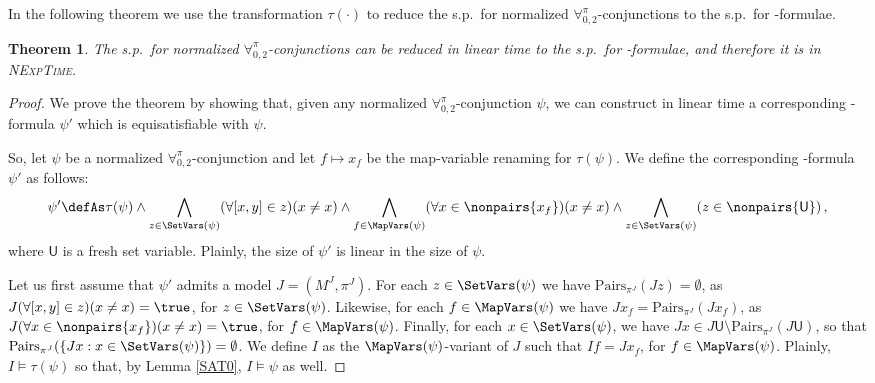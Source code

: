 \documentclass[submission,copyright,creativecommons]{eptcs}
\newtheorem{theorem}{Theorem}
\newcommand{\Lang}{\ensuremath{\mathbf{\forall}^{\pi}_{0,2}}\xspace}
\newcommand{\assignment}[1]{M^{#1}}
\newcommand{\pairf}[1]{\pi^{#1}}
\newcommand{\inter}{I}
\newcommand{\interp}{J}
\newcommand{\ipairfp}{\pairf{\interp}}
\newcommand{\iassignmentp}{\assignment{\interp}}
\newcommand{\pairs}[2]{\mathrm{Pairs}_{\pi^{#1}}(#2)}
\newcommand{\D}{\corr{\mathsf{U}}}
\newcommand{\svx}{x}
\newcommand{\svy}{y}
\newcommand{\svz}{z}
\newcommand{\mvx}{f}
\newcommand{\corr}[1]{#1}
\begin{document}
In the following theorem we use the transformation $\tau(\cdot)$ to
reduce the s.p.\ for normalized \Lang-conjunctions to the s.p.\ for
\Forallpizero-formulae.

\begin{theorem}\label{DEC}
The s.p.\ for normalized \Lang-conjunctions can be reduced in linear
time to the s.p.\ for \Forallpizero-formulae, and therefore it is in
\textsc{NExpTime}.
\end{theorem}
\begin{proof}
We prove the theorem by showing that, given any normalized
\Lang-conjunction $\psi$, we can construct in linear time a
corresponding \Forallpizero-formula $\psi'$ which is
equisatisfiable with $\psi$.

So, let $\psi$ be a normalized \Lang-conjunction and let $\mvx
\mapsto \svx_\mvx$ be the map-variable renaming for $\tau(\psi)$.
We define the corresponding \Forallpizero-formula $\psi'$ as
follows:
\[
\psi' \defAs \tau(\psi) 
\wedge \bigwedge_{\svz \in \SetVars(\psi)}(\forall [\svx,\svy] \in
\svz)(\svx \neq \svx) 
\wedge \bigwedge_{\mvx \in \MapVars(\psi)} (\forall \svx \in
\nonpairs{\svx_\mvx})(\svx \neq \svx) 
\wedge \bigwedge_{\svz \in \SetVars(\psi)} (\svz \in \nonpairs{\D})
\,,
\]
where $\D$ is a fresh set variable. Plainly, the size of $\psi'$ 
is linear in the size of $\psi$.

Let us first assume that $\psi'$ admits a model $\interp =
(\iassignmentp, \ipairfp)$.  For each $\svz \in \SetVars(\psi)$ we
have $\pairs{\interp}{\interp \svz}=\emptyset$, as $\interp (\forall
[\svx,\svy] \in \svz)(\svx \neq \svx) = \true$, for $\svz \in
\SetVars(\psi)$.  Likewise, for each $\mvx \in \MapVars(\psi)$
we have $\interp \svx_\mvx = \pairs{\interp}{\interp \svx_\mvx}$, as
$\interp (\forall \svx \in \nonpairs{\svx_\mvx})(\svx \neq \svx) =
\true$, for $\mvx \in \MapVars(\psi)$.  Finally, for each $\svx \in
\SetVars(\psi)$, we have $\interp \svx \in \interp \D \setminus
\pairs{\interp}{\interp \D}$, so that $\pairs{\interp}{\{ \interp \svx
: \svx \in \SetVars(\psi)\}} = \emptyset$.
We define $\inter$ as the $\MapVars(\psi)$-variant of $\interp$
such that $\inter \mvx = \interp \svx_\mvx$, for $\mvx \in
\MapVars(\psi)$.  Plainly, $\inter \models \tau(\psi)$ so
that, by Lemma \ref{SAT0}, $\inter \models \psi$ as well.


\end{proof}
\end{document}
